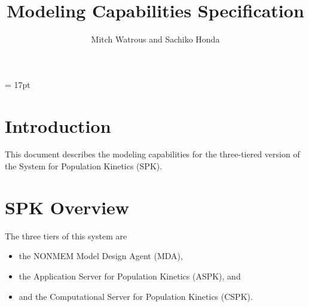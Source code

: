 \documentclass{article}
\begin{document}
\large
\baselineskip = 17pt

\newcommand{\R}{\mbox{\bf R}}
\newcommand{\Z}{\mbox{\bf Z}}
\newcommand{\N}{\mbox{\bf N}}
\newcommand{\E}{\mbox{\bf E}}
\newcommand{\V}{\mbox{\bf V}}
\newcommand{\Th}[1]{$#1$th}
\newcommand{\BS}{$\backslash$}
\newcommand{\Arg}[1]{\bigskip \noindent $#1$ \linebreak}
\newcommand{\TT}[1]{\bigskip \noindent {\tt #1 } \linebreak}
\newcommand{\rvec}{\mbox{rvec}}


%
%


\title{Modeling Capabilities Specification}

\author{Mitch Watrous and Sachiko Honda}

\maketitle



\tableofcontents

\newpage


%
\section{Introduction}
%

This document describes the modeling capabilities for the 
three-tiered version of the System for Population Kinetics (SPK).


%
\section{SPK Overview}
%

The three tiers of this system are
\begin{itemize}
  \item the NONMEM Model Design Agent (MDA),
  \item the Application Server for Population Kinetics (ASPK), and
  \item and the Computational Server for Population Kinetics (CSPK).
\end{itemize}
\end{document}

